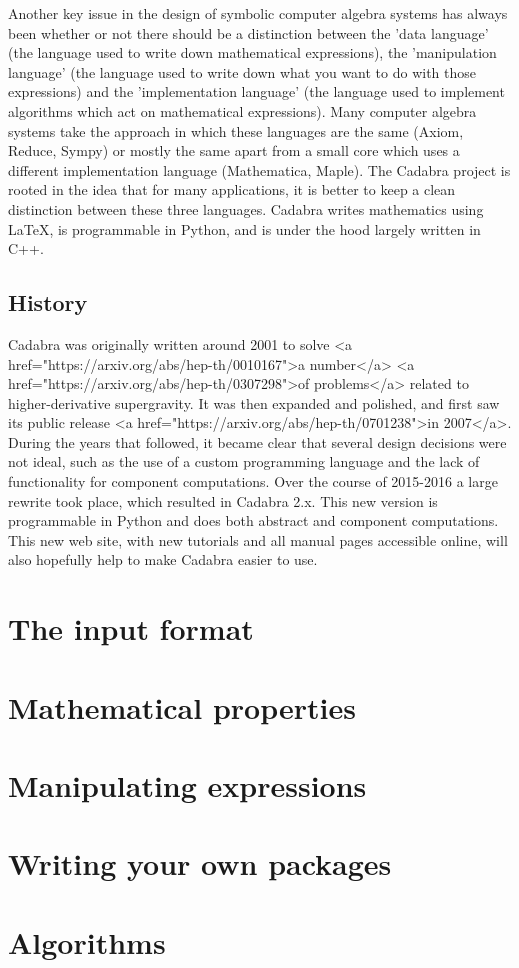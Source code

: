 \documentclass[11pt]{book}
\begin{document}
Another key issue in the design of symbolic computer algebra systems
has always been whether or not there should be a distinction between
the 'data language' (the language used to write down mathematical
expressions), the 'manipulation language' (the language used to write
down what you want to do with those expressions) and the
'implementation language' (the language used to implement algorithms
which act on mathematical expressions). Many computer algebra systems
take the approach in which these languages are the same (Axiom,
Reduce, Sympy) or mostly the same apart from a small core which uses a
different implementation language (Mathematica, Maple). The Cadabra
project is rooted in the idea that for many applications, it is better
to keep a clean distinction between these three languages. Cadabra
writes mathematics using LaTeX, is programmable in Python, and is
under the hood largely written in C++.

\section{History}

Cadabra was originally written around 2001 to solve <a
href="https://arxiv.org/abs/hep-th/0010167">a number</a> <a
href="https://arxiv.org/abs/hep-th/0307298">of problems</a> related to
higher-derivative supergravity. It was then expanded and polished, and
first saw its public release <a
href="https://arxiv.org/abs/hep-th/0701238">in 2007</a>.  During the
years that followed, it became clear that several design decisions
were not ideal, such as the use of a custom programming language and
the lack of functionality for component computations. Over the course
of 2015-2016 a large rewrite took place, which resulted in Cadabra
2.x.  This new version is programmable in Python and does both
abstract and component computations. This new web site, with new
tutorials and all manual pages accessible online, will also hopefully
help to make Cadabra easier to use.


\chapter{The input format}






\chapter{Mathematical properties}


\chapter{Manipulating expressions}





\chapter{Writing your own packages}


\chapter{Algorithms}

\end{document}
